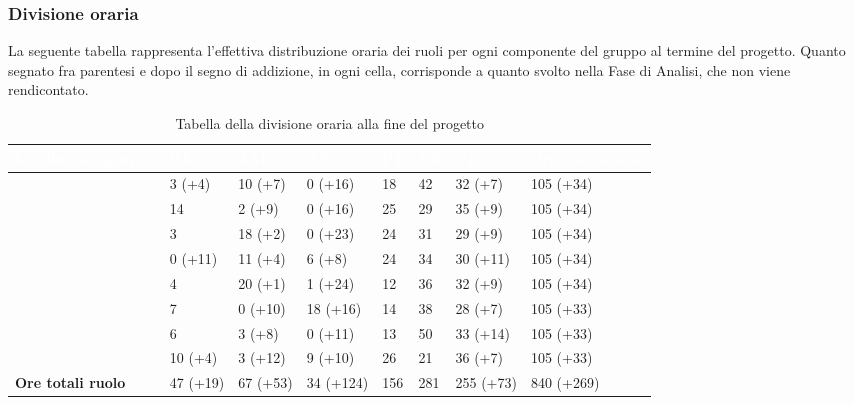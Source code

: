\subsubsection{Divisione oraria}
La seguente tabella rappresenta l'effettiva distribuzione oraria dei ruoli per ogni componente del gruppo al termine del progetto. Quanto segnato fra parentesi e dopo il segno di addizione, in ogni cella, corrisponde a quanto svolto nella Fase di Analisi, che non viene rendicontato.
{
\renewcommand{\arraystretch}{2}
\begin{longtable}[h!] { C{3cm} C{1.4cm} C{1.4cm} C{1.6cm} C{0.9cm} C{0.9cm} C{1.6cm} C{2.3cm}}
\caption{Tabella della divisione oraria alla fine del progetto}\\

\textcolor{white}{\textbf{Membro del gruppo}} & 
\textcolor{white}{\textbf{RE}} & 
\textcolor{white}{\textbf{AM}} & 
\textcolor{white}{\textbf{AN}} & 
\textcolor{white}{\textbf{PT}} & 
\textcolor{white}{\textbf{PR}} & 
\textcolor{white}{\textbf{VE}} & 
\textcolor{white}{\textbf{Ore complessive}}\\	
\endhead
        
\MC{}                     &  3 (+4)  & 10 (+7)  &  0 (+16)  &  18 &  42 &  32 (+7)  & 105 (+34)  \\
\LD{}                     & 14       &  2 (+9)  &  0 (+16)  &  25 &  29 &  35 (+9)  & 105 (+34)  \\
\CE{}                     &  3       & 18 (+2)  &  0 (+23)  &  24 &  31 &  29 (+9)  & 105 (+34)  \\
\SE{}                     &  0 (+11) & 11 (+4)  &  6 (+8)   &  24 &  34 &  30 (+11) & 105 (+34)  \\
\PF{}                     &  4       & 20 (+1)  &  1 (+24)  &  12 &  36 &  32 (+9)  & 105 (+34)  \\
\DF{}                     &  7       &  0 (+10) & 18 (+16)  &  14 &  38 &  28 (+7)  & 105 (+33)  \\
\BR{}                     &  6       &  3 (+8)  &  0 (+11)  &  13 &  50 &  33 (+14) & 105 (+33)  \\
\AT{}                     & 10 (+4)  &  3 (+12) &  9 (+10)  &  26 &  21 &  36 (+7)  & 105 (+33)  \\
\textbf{Ore totali ruolo} & 47 (+19) & 67 (+53) & 34 (+124) & 156 & 281 & 255 (+73) & 840 (+269) \\
		
\end{longtable}
}

